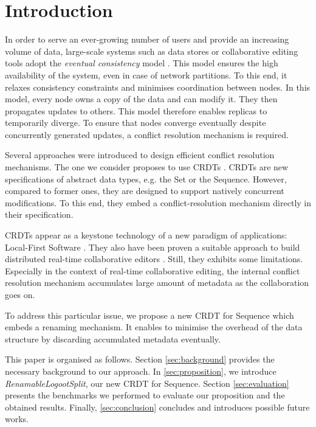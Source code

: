 \documentclass[sigplan,10pt]{acmart}
\begin{document}
\section{Introduction}

In order to serve an ever-growing number of users and provide an increasing volume of data, large-scale systems such as data stores or collaborative editing tools adopt the \emph{eventual consistency} model \cite{10.1145/224057.224070}.
This model ensures the high availability of the system, even in case of network partitions.
To this end, it relaxes consistency constraints and minimises coordination between nodes.
In this model, every node owns a copy of the data and can modify it.
They then propagates updates to others.
This model therefore enables replicas to temporarily diverge.
To ensure that nodes converge eventually despite concurrently generated updates, a conflict resolution mechanism is required.

Several approaches were introduced to design efficient conflict resolution mechanisms.
The one we consider proposes to use \acfp{CRDT} \cite{shapiro_2011_crdt}.
\acp{CRDT} are new specifications of abstract data types, e.g. the Set or the Sequence.
However, compared to former ones, they are designed to support natively concurrent modifications.
To this end, they embed a conflict-resolution mechanism directly in their specification.

\acp{CRDT} appear as a keystone technology of a new paradigm of applications: Local-First Software \cite{10.1145/3359591.3359737}.
They also have been proven a suitable approach to build distributed real-time collaborative editors \cite{doi:10.1002/cpe.4108}.
Still, they exhibits some limitations.
Especially in the context of real-time collaborative editing, the internal conflict resolution mechanism accumulates large amount of metadata as the collaboration goes on.

To address this particular issue, we propose a new \ac{CRDT} for Sequence which embeds a renaming mechanism.
It enables to minimise the overhead of the data structure by discarding accumulated metadata eventually.

This paper is organised as follows.
Section \ref{sec:background} provides the necessary background to our approach.
In \autoref{sec:proposition}, we introduce \emph{RenamableLogootSplit}, our new \ac{CRDT} for Sequence.
Section \ref{sec:evaluation} presents the benchmarks we performed to evaluate our proposition and the obtained results.
Finally, \autoref{sec:conclusion} concludes and introduces possible future works.
\end{document}
